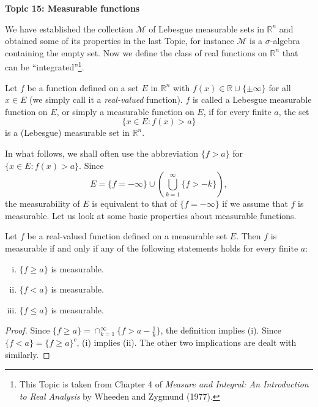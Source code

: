 \documentclass[11pt]{article}
\begin{document}
\begin{center}
  \textbf{Topic 15: Measurable functions}
\end{center}

We have established the collection $\mathcal{M}$ of Lebesgue measurable sets in $\mathbb{R}^n$ and obtained some of its properties in the last Topic, for instance $\mathcal{M}$ is a $\sigma$-algebra containing the empty set.  Now we define the class of real functions on $\mathbb{R}^n$ that can be ``integrated''\footnote{This Topic is taken from Chapter 4 of \textit{Measure and Integral: An Introduction to Real Analysis} by Wheeden and Zygmund (1977).}. 

\begin{defn}
  Let $f$ be a function defined on a set $E$ in $\mathbb{R}^n$ with $f(x) \in \mathbb{R} \cup \{ \pm\infty \}$ for all $x \in E$ (we simply call it a \textit{real-valued} function).  $f$ is called a \textsf{Lebesgue measurable function} on $E$, or simply a \textsf{measurable function} on $E$, if for every finite $a$, the set
  \[
    \{ x \in E \colon f(x) > a \}
  \]
  is a (Lebesgue) measurable set in $\mathbb{R}^n$.
\end{defn}

In what follows, we shall often use the abbreviation $\{ f > a \}$ for $\{ x \in E \colon f(x) > a \}$.  Since
\[
  E = \{ f = -\infty \} \cup \left( \bigcup_{k=1}^\infty \{ f > -k \} \right),
\]
the measurability of $E$ is equivalent to that of $\{ f = - \infty \}$ if we assume that $f$ is measurable.  Let us look at some basic properties about measurable functions.

\begin{thm}
  Let $f$ be a real-valued function defined on a measurable set $E$.  Then $f$ is measurable if and only if any of the following statements holds for every finite $a$:
  \begin{enumerate}[(i)]
    \item $\{ f \geqslant a \}$ is measurable.

    \item $\{ f < a \}$ is measurable.

    \item $\{ f \leqslant a \}$ is measurable.
  \end{enumerate}
\end{thm}

\begin{proof}
  Since $\{ f \geqslant a \} = \cap_{k=1}^\infty \{ f > a - \frac{1}{k} \}$, the definition implies (i).  Since $\{ f < a \} = \{ f \geqslant a \}^c$, (i) implies (ii).  The other two implications are dealt with similarly.
\end{proof}
\end{document}
